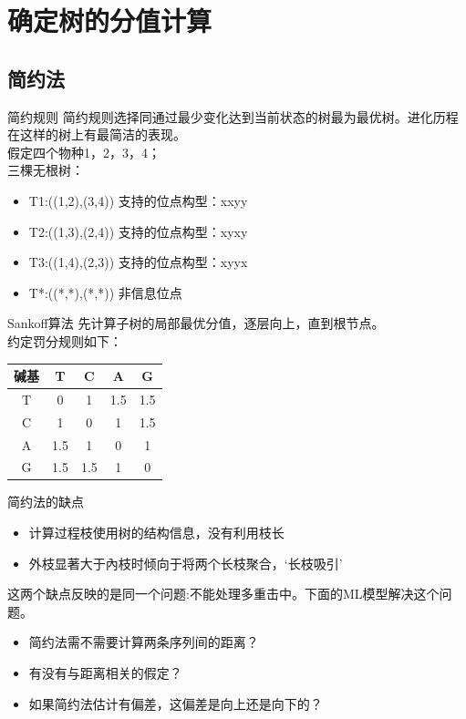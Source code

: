 \documentclass{beamer}
\begin{document}
\section{确定树的分值计算}
\subsection{简约法}
\begin{frame}{简约规则}
简约规则选择同通过最少变化达到当前状态的树最为最优树。进化历程在这样的树上有最简洁的表现。\\
假定四个物种1，2，3，4；\\
三棵无根树：\\
\begin{itemize}
	\item T1:((1,2),(3,4)) 支持的位点构型：xxyy
	\item T2:((1,3),(2,4)) 支持的位点构型：xyxy
	\item T3:((1,4),(2,3)) 支持的位点构型：xyyx
	\item T*:((*,*),(*,*)) 非信息位点
\end{itemize}
\end{frame}

\begin{frame}{Sankoff算法}
先计算子树的局部最优分值，逐层向上，直到根节点。\\
约定罚分规则如下：\\
\begin{tabular}{c|c|c|c|c}
碱基&T&C&A&G\\
\hline
T&0&1&1.5&1.5\\
\hline
C&1&0&1&1.5\\
\hline
A&1.5&1&0&1\\
\hline
G&1.5&1.5&1&0\\
\end{tabular}
\end{frame}
\begin{frame}{简约法的缺点}
\begin{itemize}
	\item 计算过程枝使用树的结构信息，没有利用枝长
	\item 外枝显著大于內枝时倾向于将两个长枝聚合，‘长枝吸引’
\end{itemize}
这两个缺点反映的是同一个问题:不能处理多重击中。下面的ML模型解决这个问题。
\begin{itemize}
	\item 简约法需不需要计算两条序列间的距离？
	\item 有没有与距离相关的假定？
	\item 如果简约法估计有偏差，这偏差是向上还是向下的？
\end{itemize}	
\end{frame}
\end{document}
